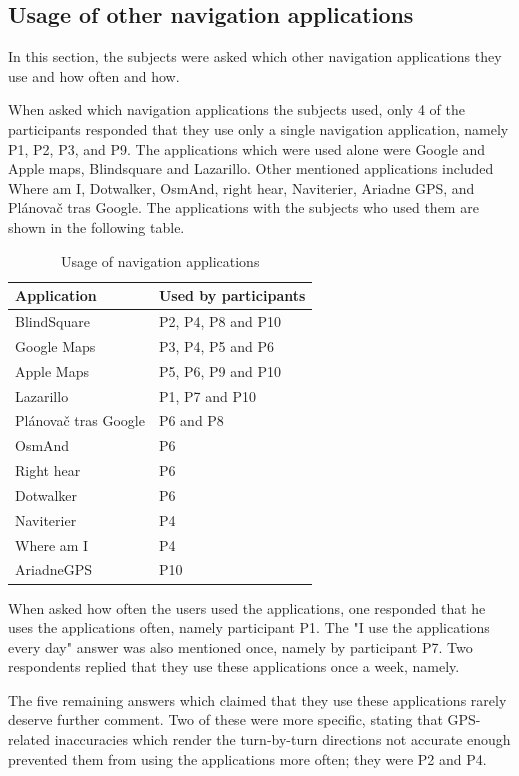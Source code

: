 \documentclass[nolof,digital]{fithesis3}
\begin{document}
\subsection{Usage of other navigation applications}
In this section, the subjects were asked which other navigation applications they use and how often and how.

When asked which navigation applications the subjects used, only 4 of the participants responded that they use only a single navigation application, namely P1, P2, P3, and P9. The applications which were used alone were Google and Apple maps, Blindsquare and Lazarillo. Other mentioned applications included Where am I, Dotwalker, OsmAnd, right hear, Naviterier, Ariadne GPS, and Plánovač tras Google. The applications with the subjects who used them are shown in the following table.

\begin{table}
\caption{Usage of navigation applications}
\begin{tabularx}{\textwidth}{|X|X|}
Application & Used by participants \\
\hline
BlindSquare \parencite{blindsquare} & P2, P4, P8 and P10 \\
Google Maps \parencite{googlemaps} & P3, P4, P5 and P6 \\
Apple Maps \parencite{applemaps} & P5, P6, P9 and P10 \\
Lazarillo \parencite{lazarillo} & P1, P7 and P10 \\
Plánovač tras Google \parencite{ptg} & P6 and P8 \\
OsmAnd \parencite{osmand} & P6 \\
Right hear \parencite{righthear} & P6 \\
Dotwalker \parencite{dotwalker} & P6 \\
Naviterier \parencite{naviterier} & P4 \\
Where am I \parencite{whereami} & P4 \\
AriadneGPS \parencite{ariadnegps} & P10 \\
\end{tabularx}
\end{table}

When asked how often the users used the applications, one responded that he uses the applications often, namely participant P1. The "I use the applications every day" answer was also mentioned once, namely by participant P7. Two respondents replied that they use these applications once a week, namely.

The five remaining answers which claimed that they use these applications rarely deserve further comment. Two of these were more specific, stating that GPS-related inaccuracies which render the turn-by-turn directions not accurate enough prevented them from using the applications more often; they were P2 and P4.
\end{document}

